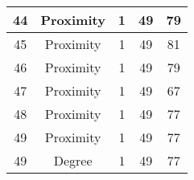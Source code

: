\documentclass[results.tex]{subfiles}
\begin{document}
\begin{center}
\begin{tabular}{| c || c | c | c | c |}
    \hline
    44 & Proximity & 1 & 49 & 79 \\ 
    \hline
    45 & Proximity & 1 & 49 & 81 \\ 
    \hline
    46 & Proximity & 1 & 49 & 79 \\ 
    \hline
    47 & Proximity & 1 & 49 & 67 \\ 
    \hline
    48 & Proximity & 1 & 49 & 77 \\ 
    \hline
    49 & Proximity & 1 & 49 & 77 \\ 
    \hline
    49 & Degree & 1 & 49 & 77 \\ 
    \hline   \end{tabular}
\end{center}
\end{document}
